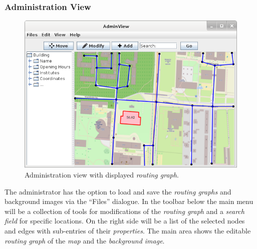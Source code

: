 
\subsubsection*{Administration View}
\begin{figure}[!h]
	\centering
	\includegraphics[scale=0.7]{gui-pictures/AdminView.png}
	\caption{Administration view with displayed \textit{routing graph}.}
\end{figure}
The administrator has the option to load and save the \textit{routing graphs} and
background images via the ``Files'' dialogue. In the toolbar below the main menu
will be a collection of tools for modifications of the \textit{routing graph} and
a \textit{search field} for specific locations.
On the right side will be a list of the selected nodes and edges with sub-entries of their
\textit{properties}. The main area shows the editable \textit{routing graph} of the \textit{map} and the \textit{background image}.

